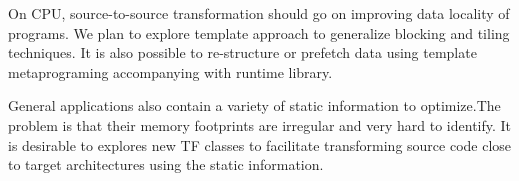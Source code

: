 On CPU, source-to-source transformation should go on improving data
locality of programs. We plan to explore template approach to  generalize
blocking and tiling techniques.  It is also possible to re-structure
or prefetch data using template metaprograming accompanying with
runtime library.

General applications also contain a variety of static information to
optimize.The problem is that their memory footprints are irregular and
very hard to identify. It is desirable to explores new TF classes to facilitate
transforming source code close to target architectures using the static
information.
